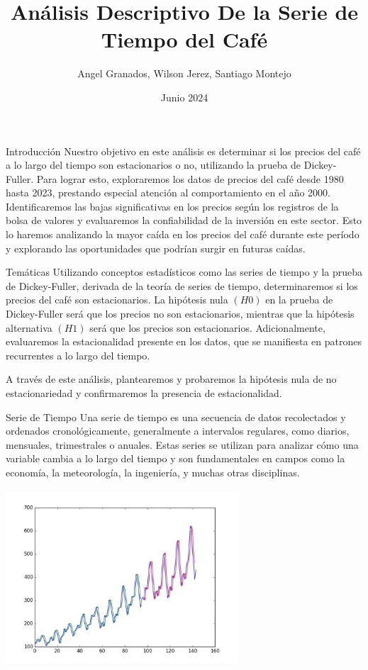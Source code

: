 \documentclass[
  10pt,
  ignorenonframetext,
  aspectratio=1612]{beamer}
\title{Análisis Descriptivo De la Serie de Tiempo del Café}
\author{Angel Granados, Wilson Jerez, Santiago Montejo}
\date{Junio 2024}
\begin{document}
\frame{\titlepage}

\begin{frame}{Introducción}
\label{introducciuxf3n}
Nuestro objetivo en este análisis es determinar si los precios del café
a lo largo del tiempo son estacionarios o no, utilizando la prueba de
Dickey-Fuller. Para lograr esto, exploraremos los datos de precios del
café desde 1980 hasta 2023, prestando especial atención al
comportamiento en el año 2000. Identificaremos las bajas significativas
en los precios según los registros de la bolsa de valores y evaluaremos
la confiabilidad de la inversión en este sector. Esto lo haremos
analizando la mayor caída en los precios del café durante este período y
explorando las oportunidades que podrían surgir en futuras caídas.
\end{frame}

\begin{frame}{Temáticas}
\label{temuxe1ticas}
Utilizando conceptos estadísticos como las series de tiempo y la prueba
de Dickey-Fuller, derivada de la teoría de series de tiempo,
determinaremos si los precios del café son estacionarios. La hipótesis
nula \((H0)\) en la prueba de Dickey-Fuller será que los precios no son
estacionarios, mientras que la hipótesis alternativa \((H1)\) será que
los precios son estacionarios. Adicionalmente, evaluaremos la
estacionalidad presente en los datos, que se manifiesta en patrones
recurrentes a lo largo del tiempo.

A través de este análisis, plantearemos y probaremos la hipótesis nula
de no estacionariedad y confirmaremos la presencia de estacionalidad.
\end{frame}

\begin{frame}{Serie de Tiempo}
\label{serie-de-tiempo}
Una serie de tiempo es una secuencia de datos recolectados y ordenados
cronológicamente, generalmente a intervalos regulares, como diarios,
mensuales, trimestrales o anuales. Estas series se utilizan para
analizar cómo una variable cambia a lo largo del tiempo y son
fundamentales en campos como la economía, la meteorología, la
ingeniería, y muchas otras disciplinas.

\begin{center}
\includegraphics[width=0.65\textwidth]{st.jpeg}
\end{center}
\end{frame}
\end{document}
